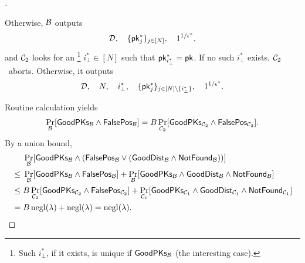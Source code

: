 \begin{proof}[]
\begin{itemize}
Otherwise, ${\mathcal{B}}$ outputs
\begin{align*}
\scriptD,\quad
\{\pk_j^\ast\}_{j\in[N]},\quad
1^{1/\epsilon^\ast},
\end{align*}
and ${\mathcal{C}}_2$ looks for an%
\footnote{Such $i_\bot^\ast$, if it exists, is unique if $\GoodPKs_\scriptB$
(the interesting case).}
${i_\bot^\ast\in[N]}$ such that ${\pk_{i_\bot^\ast}^\ast=\pk}$.
If no such $i_\bot^\ast$ exists, ${\mathcal{C}}_2$~aborts.
Otherwise, it outputs
\begin{align*}
\scriptD,\quad
N,\quad
i_\bot^\ast,\quad
\{\pk_j^\ast\}_{j\in{[N]\setminus{\{i_\bot^\ast\}}}},\quad
1^{1/\epsilon^\ast}.
\end{align*}
\end{itemize}
Routine calculation yields
\begin{align*}
\Pr_\scriptB[\GoodPKs_\scriptB\wedge\FalsePos_\scriptB]
=
B\Pr_{\scriptC_2}[\GoodPKs_{\scriptC_2}\wedge\FalsePos_{\scriptC_2}].
\end{align*}
By a union bound,
\begin{align*}
&
\Pr_\scriptB[\GoodPKs_\scriptB\wedge(\FalsePos_\scriptB\vee(\GoodDist_\scriptB\wedge\NotFound_\scriptB))]
\\\WideNarrow{}{\mathllap}{{}\leq{}}&
\Pr_\scriptB[\GoodPKs_\scriptB\wedge\FalsePos_\scriptB]
+
\Pr_\scriptB[\GoodPKs_\scriptB\wedge\GoodDist_\scriptB\wedge\NotFound_\scriptB]
\\\WideNarrow{}{\mathllap}{{}\leq{}}&
B\Pr_{\scriptC_2}[\GoodPKs_{\scriptC_2}\wedge\FalsePos_{\scriptC_2}]
+
\Pr_{\scriptC_1}
[\GoodPKs_{\scriptC_1}\wedge\GoodDist_{\scriptC_1}\wedge\NotFound_{\scriptC_1}]
\WideNarrow{}{\hspace*{-1em}}
\\\WideNarrow{}{\mathllap}{{}={}}&
B\negl(\lambda)+\negl(\lambda)
=
\negl(\lambda).
\qedhere
\end{align*}
\end{proof}

